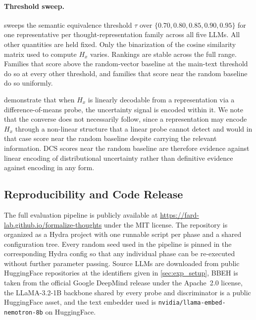 \paragraph{Threshold sweep.}  sweeps the semantic equivalence threshold $\tau$ over $\{0.70, 0.80, 0.85, 0.90, 0.95\}$ for one representative per thought-representation family across all five LLMs.
All other quantities are held fixed. Only the binarization of the cosine similarity matrix used to compute $H_x$ varies.
Rankings are stable across the full range. Families that score above the random-vector baseline at the main-text threshold do so at every other threshold, and families that score near the random baseline do so uniformly.

\citet{cencerrado2026answerneededpredictingllm} demonstrate that when $H_x$ is linearly decodable from a representation via a difference-of-means probe, the uncertainty signal is encoded within it.
We note that the converse does not necessarily follow, since a representation may encode $H_x$ through a non-linear structure that a linear probe cannot detect and would in that case score near the random baseline despite carrying the relevant information.
DCS scores near the random baseline are therefore evidence against linear encoding of distributional uncertainty rather than definitive evidence against encoding in any form.



\subsection{Reproducibility and Code Release}
\label{appendix:sub:reproducibility}

The full evaluation pipeline is publicly available at \url{https://fard-lab.github.io/formalize-thoughts} under the MIT license. The repository is organized as a Hydra project with one runnable script per phase and a shared configuration tree. Every random seed used in the pipeline is pinned in the corresponding Hydra config so that any individual phase can be re-executed without further parameter passing. Source LLMs are downloaded from public HuggingFace repositories at the identifiers given in \cref{sec:exp_setup}, BBEH is taken from the official Google DeepMind release under the Apache~2.0 license, the LLaMA-3.2-1B backbone shared by every probe and discriminator is a public HuggingFace asset, and the text embedder used is \texttt{nvidia/llama-embed-nemotron-8b} on HuggingFace.

